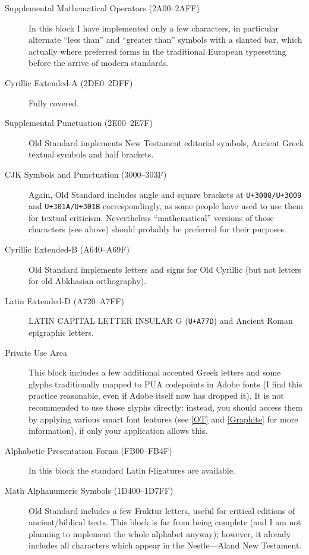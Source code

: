 \documentclass[12pt,a4paper,openany]{book}
\begin{document}
\begin{description}
\item[Supplemental Mathematical Operators (2A00–2AFF)] In this block I have
implemented only a few characters, in particular alternate “less than” and
“greater than” symbols with a slanted bar, which actually where preferred
forms in the traditional European typesetting before the arrive of modern
standards.

\item[Cyrillic Extended-A (2DE0–2DFF)] Fully covered.

\item[Supplemental Punctuation (2E00–2E7F)] Old Standard implements New
Testament editorial symbols, Ancient Greek textual symbols and half brackets.

\item[CJK Symbols and Punctuation (3000–303F)] Again, Old Standard includes
angle and square brackets at \texttt{U+3008/U+3009} and \texttt{U+301A/U+301B}
correspondingly, as some people have used to use them for textual
criticism. Nevertheless “mathematical” versions of those characters (see
above) should probably be preferred for their purposes.

\item[Cyrillic Extended-B (A640–A69F)] Old Standard implements letters and
signs for Old Cyrillic (but not letters for old Abkhasian orthography).

\item[Latin Extended-D (A720–A7FF)] LATIN CAPITAL LETTER INSULAR G (\texttt{U+A77D})
and Ancient Roman epigraphic letters.

\item[Private Use Area] This block includes a few additional accented Greek
letters and some glyphs traditionally mapped to PUA codepoints in Adobe
fonts (I find this practice reasonable, even if Adobe itself now has dropped
it). It is not recommended to use those glyphs directly: instead, you should
access them by applying various smart font features (see \autoref{OT}
and \autoref{Graphite} for more information), if only your application allows
this.

\item[Alphabetic Presentation Forms (FB00–FB4F)] In this block the standard
Latin f-ligatures are available.

\item[Math Alphanumeric Symbols (1D400–1D7FF)] Old Standard includes a few
Fraktur letters, useful for critical editions of ancient/biblical texts.
This block is far from being complete (and I am not planning to implement
the whole alphabet anyway); however, it already includes all characters
which appear in the Nestle---Aland New Testament.

\end{description}
\end{document}
